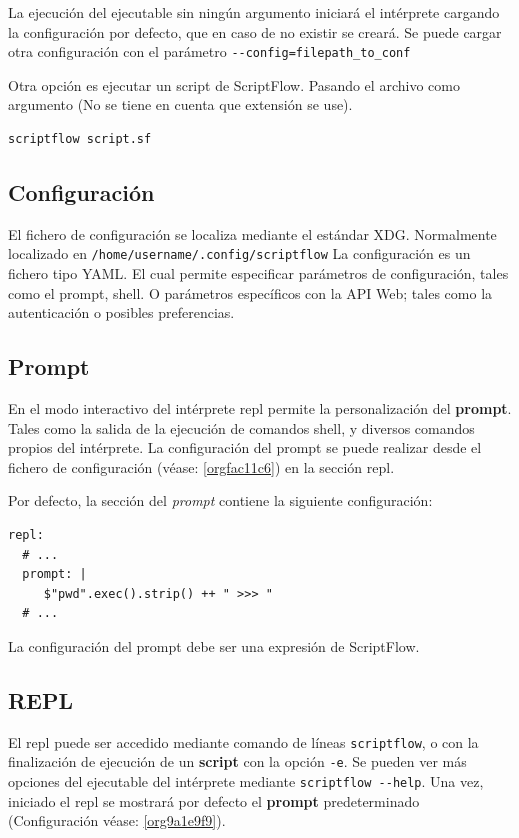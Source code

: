 \documentclass[11pt]{article}
\begin{document}
La ejecución del ejecutable sin ningún argumento iniciará el intérprete cargando la configuración por defecto, que en caso de no existir se creará.
Se puede cargar otra configuración con el parámetro \texttt{-{}-config=filepath\_to\_conf}

Otra opción es ejecutar un script de ScriptFlow. Pasando el archivo como argumento (No se tiene en cuenta que extensión se use).
\begin{verbatim}
scriptflow script.sf
\end{verbatim}

\subsection{Configuración}
\label{sec:org72ece67}

\label{orgfac11c6}
El fichero de configuración se localiza mediante el
estándar XDG. Normalmente localizado en \texttt{/home/username/.config/scriptflow}
La configuración es un fichero tipo YAML. El cual permite especificar
parámetros de configuración, tales como el prompt, shell. O parámetros
específicos con la API Web; tales como la autenticación o posibles
preferencias.

\subsection{Prompt}
\label{sec:org59e81cf}

\label{org9a1e9f9}
En el modo interactivo del intérprete \gls{repl} permite la personalización del
\textbf{prompt}. Tales como la salida de la ejecución de comandos
shell, y diversos comandos propios del intérprete. La configuración del
prompt se puede realizar desde el fichero de configuración (véase:
\ref{orgfac11c6}) en la sección \gls{repl}.

Por defecto, la sección del \emph{prompt} contiene la siguiente configuración:

\begin{verbatim}
repl:
  # ...
  prompt: |
     $"pwd".exec().strip() ++ " >>> "
  # ...
\end{verbatim}

La configuración del prompt debe ser una expresión de ScriptFlow.

\subsection{REPL}
\label{sec:org794b8f6}
El \gls{repl} puede ser accedido mediante comando de líneas \texttt{scriptflow}, o con la
finalización de ejecución de un \textbf{script} con la opción \texttt{-e}. Se pueden ver más opciones del
ejecutable del intérprete mediante \texttt{scriptflow -{}-help}. Una vez,
iniciado el \gls{repl} se mostrará por defecto el \textbf{prompt} predeterminado
(Configuración véase: \ref{org9a1e9f9}).
\end{document}
